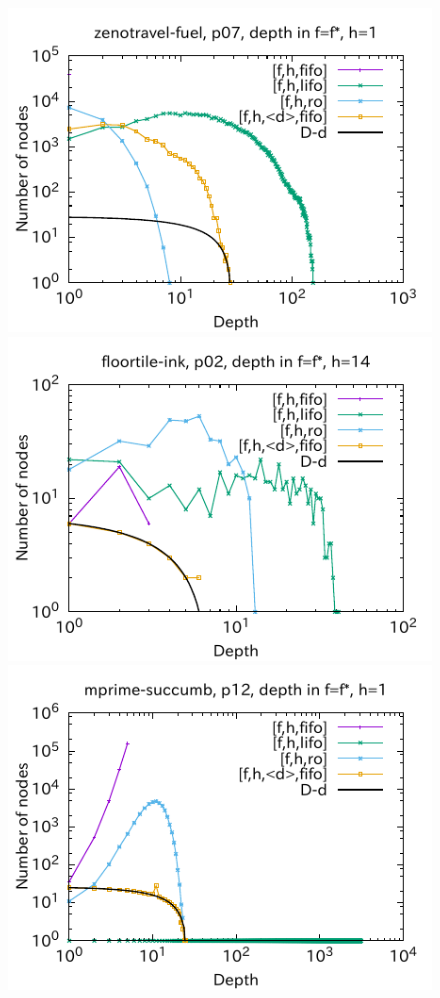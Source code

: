 \begin{figure}[htbp]
\includegraphics{img/output-lmcut/zenotravel-fuel/p07-1.pdf}
\includegraphics{img/output-lmcut/floortile-ink/p02-14.pdf}
\includegraphics{img/output-lmcut/mprime-succumb/p12-1.pdf}

\end{figure}
